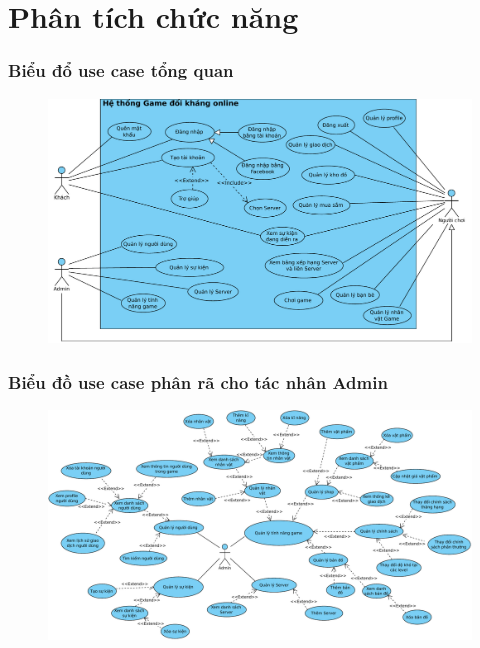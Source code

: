 \documentclass[3p]{elsarticle}
\begin{document}
\tableofcontents
\part{Phân tích chức năng}
\newpage
\section{Biểu đổ use case tổng quan}
\begin{figure}[!htbp]
	\hspace*{-.5in}
	\centering
	\includegraphics[scale=.8]{images/Overview.pdf}
\end{figure}
\newpage
\begin{landscape}
\section{Biểu đồ use case phân rã cho tác nhân Admin}
\begin{figure}[!htbp]
	\hspace*{-.5in}
	\centering
	\includegraphics[scale=.8]{images/Admin.pdf}
\end{figure}
\end{landscape}
\end{document}
